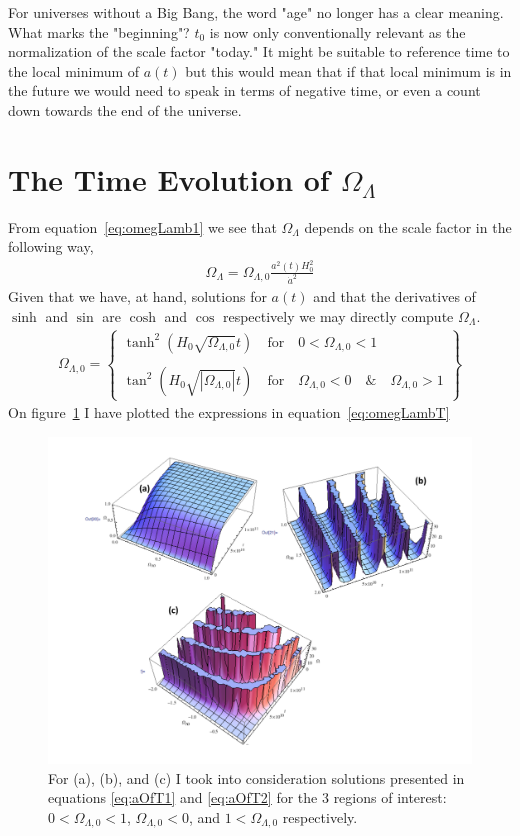 \documentclass[twoside]{article}
\begin{document}
For universes without a Big Bang, the word "age" no longer has a clear meaning.  What marks the "beginning"? $t_{0}$ is now only conventionally relevant as the normalization of the scale factor "today."  It might be suitable to reference time to the local minimum of $a(t)$ but this would mean that if that local minimum is in the future we would need to speak in terms of negative time, or even a count down towards the end of the universe. 

\section{The Time Evolution of $\Omega_{\Lambda}$}
From equation~\ref{eq:omegLamb1} we see that $\Omega_{\Lambda}$ depends on the scale factor in the following way,
\begin{align}
\Omega_{\Lambda} = \Omega_{\Lambda,0}\frac{a^{2}(t)H^{2}_{0}}{\dot{a}^{2}}
\end{align}
Given that we have, at hand, solutions for $a(t)$  and that the derivatives of $\sinh$ and $\sin$ are $\cosh$ and $\cos$ respectively we may directly compute $\Omega_{\Lambda}$.
\begin{align}
\Omega_{\Lambda,0} = \left\{\begin{array}{ll}\tanh^{2}(H_{0}\sqrt{\Omega_{\Lambda,0}}t)\quad \text{for}\quad 0<\Omega_{\Lambda,0}<1\\\\ \tan^{2}(H_{0}\sqrt{|\Omega_{\Lambda,0}|}t)\quad \text{for}\quad \Omega_{\Lambda,0}<0\quad\&\quad\Omega_{\Lambda,0}>1 \end{array}\label{eq:omegLambT}\right\}
\end{align}
 On figure~\ref{f:OmegLamb} I have plotted the  expressions in equation~\ref{eq:omegLambT}\par

\begin{figure}[h!]
  \centering
\includegraphics[width=1.2\textwidth]{OmegLamb.pdf}
  \caption{ For (a), (b), and (c) I took into consideration solutions presented in equations \ref{eq:aOfT1} and \ref{eq:aOfT2} for the 3 regions of interest: $0<\Omega_{\Lambda,0}<1$, $\Omega_{\Lambda,0}<0$, and $1<\Omega_{\Lambda,0}$ respectively. }\label{f:OmegLamb}
\end{figure}
\end{document}
